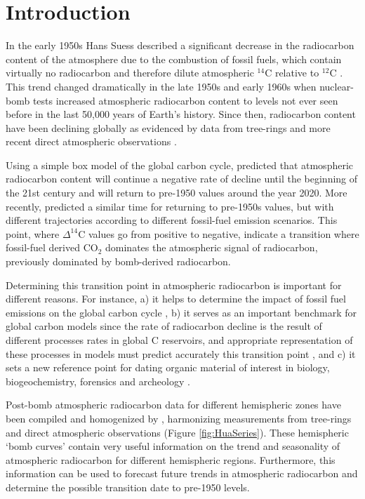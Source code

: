 
\section{Introduction}
In the early 1950s Hans Suess described a significant decrease in the radiocarbon content of the atmosphere due to the combustion of fossil fuels, which contain virtually no radiocarbon and therefore dilute atmospheric $^{14}$C relative to $^{12}$C \citep{Suess1953, Suess1955Sci}. This trend changed dramatically in the late 1950s and early 1960s when nuclear-bomb tests increased atmospheric radiocarbon content to levels not ever seen before in the last 50,000 years of Earth's history. Since then, radiocarbon content have been declining globally as evidenced by data from tree-rings and more recent direct atmospheric observations \citep{Tans1979Nature, Manning1990, Levin1989Radiocarbon, Currie2011, Graven2012JGR, Hua2013Radiocarbon, Levin2013Tellus}.

Using a simple box model of the global carbon cycle, \citet{Caldeira1998GRL} predicted that atmospheric radiocarbon content will continue a negative rate of decline until the beginning of the 21st century and will return to pre-1950 values around the year 2020. More recently, \citet{Graven2015PNAS} predicted a similar time for returning to pre-1950s values, but with different trajectories according to different fossil-fuel emission scenarios. This point, where $\Delta^{14}$C values go from positive to negative, indicate a transition where fossil-fuel derived CO$_2$ dominates the atmospheric signal of radiocarbon, previously dominated by bomb-derived radiocarbon. 

Determining this transition point in atmospheric radiocarbon is important for different reasons. For instance, a) it helps to determine the impact of fossil fuel emissions on the global carbon cycle \citep{Caldeira1998GRL, Turnbull2009JGR, Graven2015PNAS}, b) it serves as an important benchmark for global carbon models since the rate of radiocarbon decline is the result of different processes rates in global C reservoirs, and appropriate representation of these processes in models must predict accurately this transition point \citep{Oeschger1975Tellus, Randerson2002GBC, Naegler2006}, and c) it sets a new reference point for dating organic material of interest in biology, biogeochemistry, forensics and archeology \citep{Graven2015PNAS}. 

Post-bomb atmospheric radiocarbon data for different hemispheric zones have been compiled and homogenized  by \cite{Hua2013Radiocarbon}, harmonizing measurements from tree-rings \citep[e.g.][]{Hertelendi1983, Levin1997, Hua2000, Park2002, Yamada2005, Hua2012GRL, Rakowski2013} and direct atmospheric observations \citep[e.g.][]{Vogel1971, Berger1987, Manning1990, Nydal1996, Levin2004, Meijer2006, Turnbull2007, Levin2010Tellus, Currie2011, Graven2012JGR} (Figure \ref{fig:HuaSeries}). These hemispheric `bomb curves' contain very useful information on the trend and seasonality of atmospheric radiocarbon for different hemispheric regions. Furthermore, this information can be used to forecast future trends in atmospheric radiocarbon and determine the possible transition date to pre-1950 levels.

